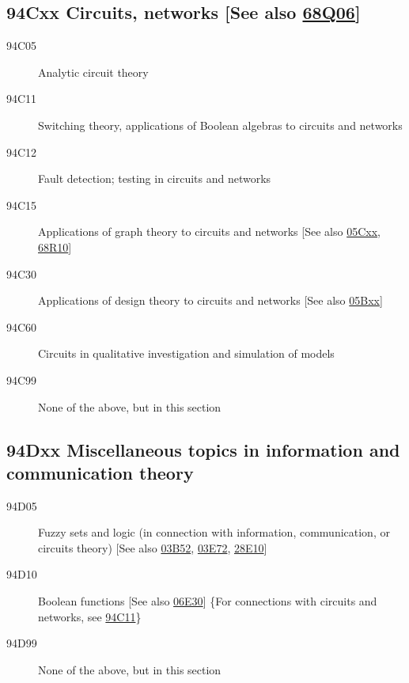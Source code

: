 \subsection*{94Cxx  Circuits, networks [See also \hyperref[68Q06]{68Q06}]}\label{94Cxx}
\begin{description}  
\item [94C05]\label{94C05} Analytic circuit theory
\item [94C11]\label{94C11} Switching theory, applications of Boolean algebras to circuits and networks
\item [94C12]\label{94C12} Fault detection; testing in circuits and networks
\item [94C15]\label{94C15} Applications of graph theory to circuits and networks [See also \hyperref[05Cxx]{05Cxx}, \hyperref[68R10]{68R10}]
\item [94C30]\label{94C30} Applications of design theory to circuits and networks [See also \hyperref[05Bxx]{05Bxx}]
\item [94C60]\label{94C60} Circuits in qualitative investigation and simulation of models
\item [94C99]\label{94C99} None of the above, but in this section
\end{description}
\subsection*{94Dxx  Miscellaneous topics in information and communication theory}\label{94Dxx}
\begin{description}  
\item [94D05]\label{94D05} Fuzzy sets and logic (in connection with information, communication, or circuits theory) [See also \hyperref[03B52]{03B52}, \hyperref[03E72]{03E72}, \hyperref[28E10]{28E10}]
\item [94D10]\label{94D10} Boolean functions [See also \hyperref[06E30]{06E30}] \{For connections with circuits and networks, see \hyperref[94C11]{94C11}\}
\item [94D99]\label{94D99} None of the above, but in this section
\end{description}
